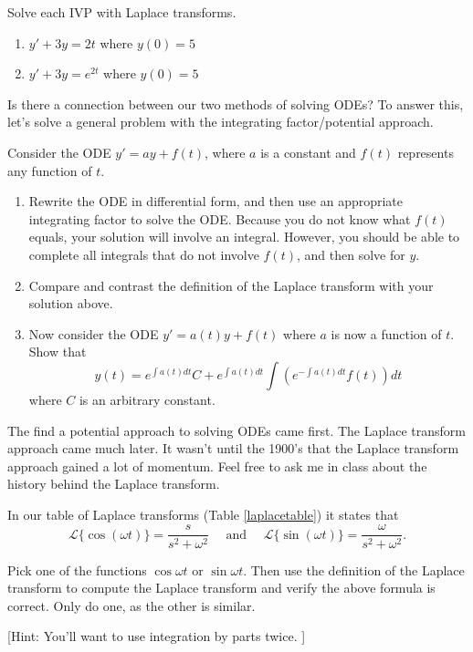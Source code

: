 \begin{problem}
Solve each IVP with Laplace transforms.  %
\begin{enumerate}
 \item $y'+3y=2t$ where $y(0)=5$
 \item $y'+3y=e^{2t}$ where $y(0)=5$
\end{enumerate}
\end{problem}

Is there a connection between our two methods of solving ODEs? To answer this, let's solve a general problem with the integrating factor/potential approach.
\begin{problem}
 Consider the ODE $y'=ay+f(t)$, where $a$ is a constant and $f(t)$ represents any function of $t$. 
\begin{enumerate}
 \item Rewrite the ODE in differential form, and then use an appropriate integrating factor to solve the ODE. Because you do not know what $f(t)$ equals, your solution will involve an integral. However, you should be able to complete all integrals that do not involve $f(t)$, and then solve for $y$.
 \item Compare and contrast the definition of the Laplace transform with your solution above.
 \item Now consider the ODE $y'=a(t)y+f(t)$ where $a$ is now a function of $t$. Show that  
$$y(t) = e^{\int a(t) dt}C+e^{\int a(t) dt} \int \left(e^{-\int a(t)dt} f(t) \right)dt$$ where $C$ is an arbitrary constant.
\end{enumerate}
\end{problem}

The find a potential approach to solving ODEs came first.  The Laplace transform approach came much later. It wasn't until the 1900's that the Laplace transform approach gained a lot of momentum. Feel free to ask me in class about the history behind the Laplace transform. 

In our table of Laplace transforms (Table \ref{laplacetable}) it states that
$$\mathscr{L}\{\cos(\omega t)\} = \dfrac{s}{s^2+\omega^2}
\quad \text{ and }\quad 
\mathscr{L}\{\sin(\omega t)\}=\dfrac{\omega}{s^2+\omega^2}.$$ 

\begin{problem}
Pick one of the functions $\cos \omega t$ or $\sin \omega t$. Then use the definition of the Laplace transform to compute the Laplace transform and verify the above formula is correct.  Only do one, as the other is similar.
  
[Hint:  You'll want to use integration by parts twice. ]
\end{problem}


